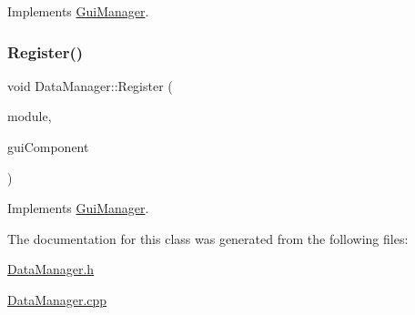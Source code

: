 Implements \mbox{\hyperlink{class_gui_manager_a062c8b90e738509c1679c1fe50b1dddc}{Gui\+Manager}}.

\mbox{\label{class_data_manager_a7be4a3267e02031eb2825fb7dd3dc4eb}} 
\subsubsection{\texorpdfstring{Register()}{Register()}}
{\footnotesize\ttfamily void Data\+Manager\+::\+Register (\begin{DoxyParamCaption}\item[{\mbox{\hyperlink{_mediator_2_mediator_2_commons_8h_a88683b64d84542943724ba0f211153af}{Module}}}]{module,  }\item[{\mbox{\hyperlink{class_gui_component}{Gui\+Component}} $\ast$}]{gui\+Component }\end{DoxyParamCaption})\hspace{0.3cm}{\ttfamily [virtual]}}



Implements \mbox{\hyperlink{class_gui_manager_acad986a245ce983ac46d0f1f38107c56}{Gui\+Manager}}.



The documentation for this class was generated from the following files\+:\begin{DoxyCompactItemize}
\item 
\mbox{\hyperlink{_data_manager_8h}{Data\+Manager.\+h}}\item 
\mbox{\hyperlink{_data_manager_8cpp}{Data\+Manager.\+cpp}}\end{DoxyCompactItemize}
